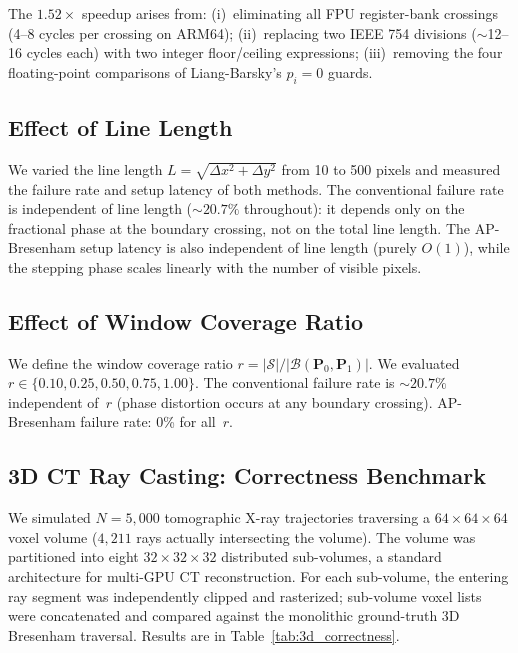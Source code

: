 \documentclass[12pt,a4paper]{article}
\theoremstyle{definition}
\newcommand{\Bresen}{\mathcal{B}}
\newcommand{\dx}{\Delta x}
\newcommand{\dy}{\Delta y}
\begin{document}
The $1.52\times$ speedup arises from: (i)~eliminating all
FPU register-bank crossings (4--8 cycles per crossing on
ARM64); (ii)~replacing two IEEE 754 divisions ($\sim$12--16
cycles each) with two integer floor/ceiling expressions;
(iii)~removing the four floating-point comparisons of
Liang-Barsky's $p_i = 0$ guards.

\subsection{Effect of Line Length}

We varied the line length $L = \sqrt{\dx^2 + \dy^2}$
from 10 to 500 pixels and measured the failure rate and
setup latency of both methods. The conventional failure
rate is independent of line length ($\sim 20.7\%$
throughout): it depends only on the fractional phase at
the boundary crossing, not on the total line length.
The AP-Bresenham setup latency is also independent of
line length (purely $O(1)$), while the stepping phase
scales linearly with the number of visible pixels.

\subsection{Effect of Window Coverage Ratio}

We define the window coverage ratio $r = |\mathcal{S}|
/ |\Bresen(\mathbf{P}_0,\mathbf{P}_1)|$. We evaluated
$r \in \{0.10, 0.25, 0.50, 0.75, 1.00\}$. The
conventional failure rate is $\sim 20.7\%$ independent
of~$r$ (phase distortion occurs at any boundary crossing).
AP-Bresenham failure rate: 0\% for all~$r$.

\subsection{3D CT Ray Casting: Correctness Benchmark}
\label{sec:exp_3d_correct}

We simulated $N = 5{,}000$ tomographic X-ray trajectories
traversing a $64\times64\times64$ voxel volume
($4{,}211$ rays actually intersecting the volume).
The volume was partitioned into eight $32\times32\times32$
distributed sub-volumes, a standard architecture for
multi-GPU CT reconstruction. For each sub-volume, the
entering ray segment was independently clipped and
rasterized; sub-volume voxel lists were concatenated and
compared against the monolithic ground-truth 3D Bresenham
traversal. Results are in Table~\ref{tab:3d_correctness}.
\end{document}

